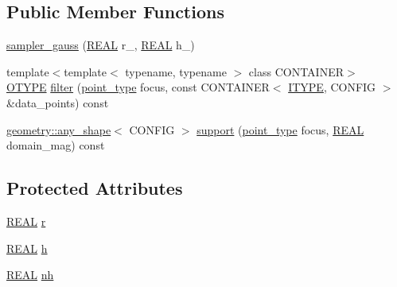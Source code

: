 \subsection*{Public Member Functions}
\begin{DoxyCompactItemize}
\item 
\hyperlink{classmui_1_1sampler__gauss_a692ea2ab45685ce8c9b7b0355ef401ed}{sampler\+\_\+gauss} (\hyperlink{classmui_1_1sampler__gauss_a35a01ac5eb1f9f41dc5642844a43366b}{R\+E\+AL} r\+\_\+, \hyperlink{classmui_1_1sampler__gauss_a35a01ac5eb1f9f41dc5642844a43366b}{R\+E\+AL} h\+\_\+)
\item 
{\footnotesize template$<$template$<$ typename, typename $>$ class C\+O\+N\+T\+A\+I\+N\+ER$>$ }\\\hyperlink{classmui_1_1sampler__gauss_a315bd10f3854b5411bcb50c6250736e8}{O\+T\+Y\+PE} \hyperlink{classmui_1_1sampler__gauss_a70aa5b27c0d7696ad23b1cb024000caa}{filter} (\hyperlink{classmui_1_1sampler__gauss_aeae4228a569ecea463221e54dade2bcc}{point\+\_\+type} focus, const C\+O\+N\+T\+A\+I\+N\+ER$<$ \hyperlink{classmui_1_1sampler__gauss_a3d12840af96d1e49b37ca6ceec0005e6}{I\+T\+Y\+PE}, C\+O\+N\+F\+IG $>$ \&data\+\_\+points) const
\item 
\hyperlink{classmui_1_1geometry_1_1any__shape}{geometry\+::any\+\_\+shape}$<$ C\+O\+N\+F\+IG $>$ \hyperlink{classmui_1_1sampler__gauss_ad25b62e266769f0e60d77ea640a9a4a2}{support} (\hyperlink{classmui_1_1sampler__gauss_aeae4228a569ecea463221e54dade2bcc}{point\+\_\+type} focus, \hyperlink{classmui_1_1sampler__gauss_a35a01ac5eb1f9f41dc5642844a43366b}{R\+E\+AL} domain\+\_\+mag) const
\end{DoxyCompactItemize}
\subsection*{Protected Attributes}
\begin{DoxyCompactItemize}
\item 
\hyperlink{classmui_1_1sampler__gauss_a35a01ac5eb1f9f41dc5642844a43366b}{R\+E\+AL} \hyperlink{classmui_1_1sampler__gauss_a70ab0b527d9c42f8b00c0722e1172f8f}{r}
\item 
\hyperlink{classmui_1_1sampler__gauss_a35a01ac5eb1f9f41dc5642844a43366b}{R\+E\+AL} \hyperlink{classmui_1_1sampler__gauss_a2689156737ae9de6e366edaaf4834c2d}{h}
\item 
\hyperlink{classmui_1_1sampler__gauss_a35a01ac5eb1f9f41dc5642844a43366b}{R\+E\+AL} \hyperlink{classmui_1_1sampler__gauss_a7eb858ff7405261598928e734e520353}{nh}
\end{DoxyCompactItemize}


